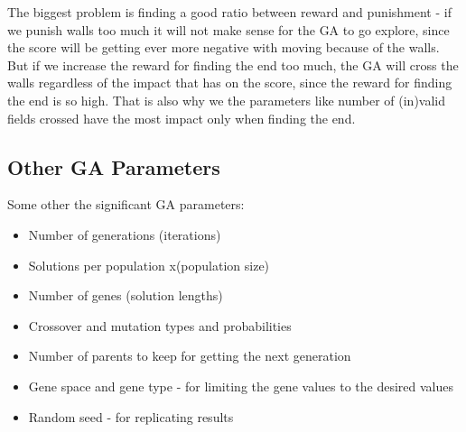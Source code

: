 \documentclass{article}
\begin{document}
The biggest problem is finding a good ratio between reward and punishment - if we punish walls too much it will not make sense for the GA to go explore, since the score will be getting ever more negative with moving because of the walls. But if we increase the reward for finding the end too much, the GA will cross the walls regardless of the impact that has on the score, since the reward for finding the end is so high. That is also why we the parameters like number of (in)valid fields crossed have the most impact only when finding the end.

\subsection{Other GA Parameters}
Some other the significant GA parameters:
\begin{itemize}
    \item Number of generations (iterations)
    \item Solutions per population x(population size)
    \item Number of genes (solution lengths)
    \item Crossover and mutation types and probabilities
    \item Number of parents to keep for getting the next generation
    \item Gene space and gene type - for limiting the gene values to the desired values
    \item Random seed - for replicating results
\end{itemize}
\end{document}

